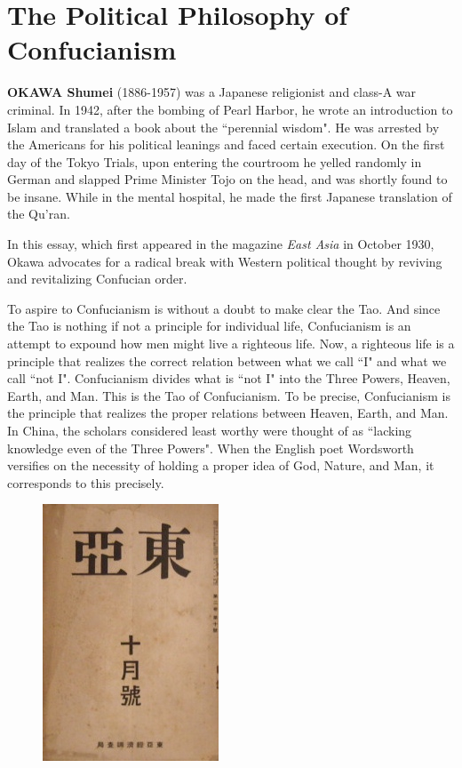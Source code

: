 \section{The Political Philosophy of Confucianism}

\begin{quotex}
\textbf{OKAWA Shumei} (1886-1957) was a Japanese religionist and class-A war criminal. In 1942, after the bombing of Pearl Harbor, he wrote an introduction to Islam and translated a book about the ``perennial wisdom". He was arrested by the Americans for his political leanings and faced certain execution. On the first day of the Tokyo Trials, upon entering the courtroom he yelled randomly in German and slapped Prime Minister Tojo on the head, and was shortly found to be insane. While in the mental hospital, he made the first Japanese translation of the Qu'ran.

In this essay, which first appeared in the magazine\emph{ East Asia }in October 1930, Okawa advocates for a radical break with Western political thought by reviving and revitalizing Confucian order.

\end{quotex}
To aspire to Confucianism is without a doubt to make clear the Tao. And since the Tao is nothing if not a principle for individual life, Confucianism is an attempt to expound how men might live a righteous life. Now, a righteous life is a principle that realizes the correct relation between what we call ``I" and what we call ``not I". Confucianism divides what is ``not I" into the Three Powers, Heaven, Earth, and Man. This is the Tao of Confucianism. To be precise, Confucianism is the principle that realizes the proper relations between Heaven, Earth, and Man. In China, the scholars considered least worthy were thought of as ``lacking knowledge even of the Three Powers". When the English poet Wordsworth versifies on the necessity of holding a proper idea of God, Nature, and Man, it corresponds to this precisely.

\begin{figure}
\includegraphics[scale=.5]{a20130223ThePoliticalPhilosophyofConfucianism-img001.jpg} 
\end{figure}

